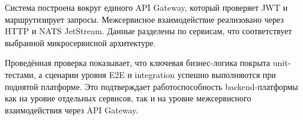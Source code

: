 Система построена вокруг единого API Gateway, который проверяет JWT и маршрутизирует запросы. Межсервисное взаимодействие реализовано через HTTP и NATS JetStream. Данные разделены по сервисам, что соответствует выбранной микросервисной архитектуре.

Проведённая проверка показывает, что ключевая бизнес-логика покрыта unit-тестами, а сценарии уровня E2E и integration успешно выполняются при поднятой платформе. Это подтверждает работоспособность backend-платформы как на уровне отдельных сервисов, так и на уровне межсервисного взаимодействия через API Gateway.
